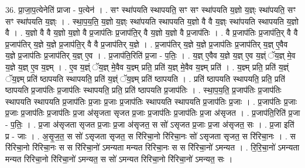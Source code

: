 \documentclass[17pt]{extarticle}
\begin{document}
36. प्रा॒जा॒प॒त्येनेति॑ प्राजा - प॒त्येन॑ । . सꣳ स्था॑पयति स्थापयति॒ सꣳ सꣳ स्था॑पयति य॒ज्ञो य॒ज्ञ्ः स्था॑पयति॒ सꣳ सꣳ स्था॑पयति य॒ज्ञ्ः । . स्था॒प॒य॒ति॒ य॒ज्ञो य॒ज्ञ्ः स्था॑पयति स्थापयति य॒ज्ञो वै वै य॒ज्ञ्ः स्था॑पयति स्थापयति य॒ज्ञो वै । . य॒ज्ञो वै वै य॒ज्ञो य॒ज्ञो वै प्र॒जाप॑तिः प्र॒जाप॑ति॒र् वै य॒ज्ञो य॒ज्ञो वै प्र॒जाप॑तिः । . वै प्र॒जाप॑तिः प्र॒जाप॑ति॒र् वै वै प्र॒जाप॑तिर् य॒ज्ञे य॒ज्ञे प्र॒जाप॑ति॒र् वै वै प्र॒जाप॑तिर् य॒ज्ञे । . प्र॒जाप॑तिर् य॒ज्ञे य॒ज्ञे प्र॒जाप॑तिः प्र॒जाप॑तिर् य॒ज्ञ् ए॒वैव य॒ज्ञे प्र॒जाप॑तिः प्र॒जाप॑तिर् य॒ज्ञ् ए॒व । . प्र॒जाप॑ति॒रिति॑ प्र॒जा - प॒तिः॒ । . य॒ज्ञ् ए॒वैव य॒ज्ञे य॒ज्ञ् ए॒व य॒ज्ञ्ं ॅय॒ज्ञ् मे॒व य॒ज्ञे य॒ज्ञ् ए॒व य॒ज्ञ्म् । . ए॒व य॒ज्ञ्ं ॅय॒ज्ञ् मे॒वैव य॒ज्ञ्म् प्रति॒ प्रति॑ य॒ज्ञ् मे॒वैव य॒ज्ञ्म् प्रति॑ । . य॒ज्ञ्म् प्रति॒ प्रति॑ य॒ज्ञ्ं ॅय॒ज्ञ्म् प्रति॑ ष्ठापयति स्थापयति॒ प्रति॑ य॒ज्ञ्ं ॅय॒ज्ञ्म् प्रति॑ ष्ठापयति । . प्रति॑ ष्ठापयति स्थापयति॒ प्रति॒ प्रति॑ ष्ठापयति प्र॒जाप॑तिः प्र॒जाप॑तिः स्थापयति॒ प्रति॒ प्रति॑ ष्ठापयति प्र॒जाप॑तिः । . स्था॒प॒य॒ति॒ प्र॒जाप॑तिः प्र॒जाप॑तिः स्थापयति स्थापयति प्र॒जाप॑तिः प्र॒जाः प्र॒जाः प्र॒जाप॑तिः स्थापयति स्थापयति प्र॒जाप॑तिः प्र॒जाः । . प्र॒जाप॑तिः प्र॒जाः प्र॒जाः प्र॒जाप॑तिः प्र॒जाप॑तिः प्र॒जा अ॑सृजता सृजत प्र॒जाः प्र॒जाप॑तिः प्र॒जाप॑तिः प्र॒जा अ॑सृजत । . प्र॒जाप॑ति॒रिति॑ प्र॒जा - प॒तिः॒ । . प्र॒जा अ॑सृजता सृजत प्र॒जाः प्र॒जा अ॑सृजत॒ स सो॑ ऽसृजत प्र॒जाः प्र॒जा अ॑सृजत॒ सः । . प्र॒जा इति॑ प्र - जाः । . अ॒सृ॒ज॒त॒ स सो॑ ऽसृजता सृजत॒ स रि॑रिचा॒नो रि॑रिचा॒नः सो॑ ऽसृजता सृजत॒ स रि॑रिचा॒नः । . स रि॑रिचा॒नो रि॑रिचा॒नः स स रि॑रिचा॒नो॑ ऽमन्यता मन्यत रिरिचा॒नः स स रि॑रिचा॒नो॑ ऽमन्यत । . रि॒रि॒चा॒नो॑ ऽमन्यता मन्यत रिरिचा॒नो रि॑रिचा॒नो॑ ऽमन्यत॒ स सो॑ ऽमन्यत रिरिचा॒नो रि॑रिचा॒नो॑ ऽमन्यत॒ सः । \newline
\end{document}
